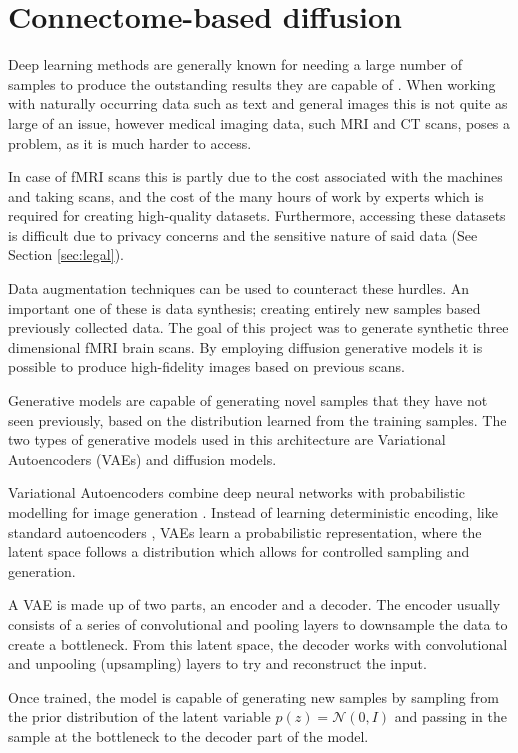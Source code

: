 \section{Connectome-based diffusion}
\label{sec:diffusion}
	
	Deep learning methods are generally known for needing a large number of samples to produce the outstanding results they are capable of \cite{alzubaidi2023survey}. When working with naturally occurring data such as text and general images this is not quite as large of an issue, however medical
	imaging data, such MRI and CT scans, poses a problem, as it is much harder to access.
	
	In case of fMRI scans this is partly due to the cost associated with the machines and taking scans, and the cost of the many hours of work by experts which is required for creating high-quality datasets. Furthermore, accessing these datasets is difficult due to privacy concerns and the sensitive nature of said data (See Section \ref{sec:legal}).

	Data augmentation techniques can be used to counteract these hurdles. An important one of these is data synthesis; creating entirely new samples based previously collected data. The goal of this project was to generate synthetic three dimensional fMRI brain scans. By employing diffusion generative models it is possible to produce high-fidelity images based on previous scans.
	
	Generative models are capable of generating novel samples that they have not seen previously, based on the distribution learned from the training samples. The two types of generative models used in this architecture are Variational Autoencoders (VAEs) and diffusion models.
	
	Variational Autoencoders combine deep neural networks with probabilistic modelling for image generation \cite{kingma2013auto}. Instead of learning deterministic encoding, like standard autoencoders \cite{bank2023autoencoders}, VAEs learn a probabilistic representation, where the latent space follows a distribution which allows for controlled sampling and generation.
	
	A VAE is made up of two parts, an encoder and a decoder. The encoder usually consists of a series of convolutional and pooling layers to downsample the data to create a bottleneck. From this latent space, the decoder works with convolutional and unpooling (upsampling) layers to try and reconstruct the input. 
	
	Once trained, the model is capable of generating new samples by sampling from the prior distribution of the latent variable $p(z) = \mathcal{N}(0,I)$ and passing in the sample at the bottleneck to the decoder part of the model.
	
